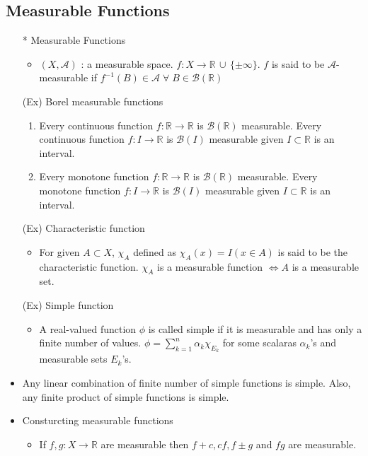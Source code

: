 \documentclass[12pt]{article}
\newcommand{\R}{\mathbb{R}}
\newcommand{\A}{\mathcal{A}}
\newcommand{\Borel}{\mathcal{B}(\mathbb{R})}
\newcommand{\forany}{\; \forall \;}
\newcommand{\union}{\,\cup\,}
\begin{document}
\subsection{Measurable Functions}
\smallskip
\begin{itemize}
    \item[*] Measurable Functions
    \begin{itemize}
        \item $(X, \A)$ : a measurable space. $f:X\rightarrow \R \union \{\pm \infty\}$. $f$ is said to be $\A$-measurable if $f^{-1}(B)\in \A \forany B\in \Borel$
    \end{itemize}
    \item[(Ex)] Borel measurable functions
    \begin{enumerate}
        \item Every continuous function $f:\R\rightarrow \R$ is $\Borel$ measurable. Every continuous function $f:I\rightarrow \R$ is $\mathcal{B}(I)$ measurable given $I\subset \R$ is an interval.
        \item Every monotone function $f:\R\rightarrow \R$ is $\Borel$ measurable. Every monotone function $f:I\rightarrow \R$ is $\mathcal{B}(I)$ measurable given $I\subset \R$ is an interval.         
    \end{enumerate} 
    \item[(Ex)] Characteristic function 
    \begin{itemize}
        \item For given $A\subset X$, $\chi_A$ defined as $\chi_A(x)=I(x\in A)$  is said to be the characteristic function. $\chi_A$ is a measurable function $\Leftrightarrow A$ is a measurable set. 
    \end{itemize} 
    \item[(Ex)] Simple function
    \begin{itemize}
        \item A real-valued function $\phi$ is called simple if it is measurable and has only a finite number of values. $\phi=\sum_{k=1}^n \alpha_{k} \chi_{E_k}$ for some scalaras $\alpha_k$'s and measurable sets $E_k$'s.
    \end{itemize}
    \item Any linear combination of finite number of simple functions is simple. Also, any finite product of simple functions is simple.
    \item Consturcting measurable functions
    \begin{itemize}
        \item If $f, g : X\rightarrow \R$ are measurable then $f+c, cf, f\pm g$ and $fg$ are measurable.

\end{itemize}
\end{itemize}
\end{document}

